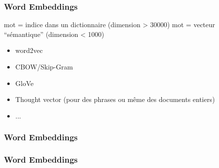 
\begin{frame}
    \frametitle{Word Embeddings} 
    mot = indice dans un dictionnaire (dimension > 30000)
    \newline
    mot = vecteur ``sémantique'' (dimension < 1000) 
    \begin{itemize}
    \item word2vec
    \item CBOW/Skip-Gram
    \item GloVe
    \item Thought vector (pour des phrases ou même des documents entiers)
    \item ...
    \end{itemize}
  \end{frame}
  
  \begin{frame}
    \frametitle{Word Embeddings} 
  \end{frame}
  
  \begin{frame}
    \frametitle{Word Embeddings} 
    \begin{center}
       \\
    \end{center}
  \end{frame}

  
